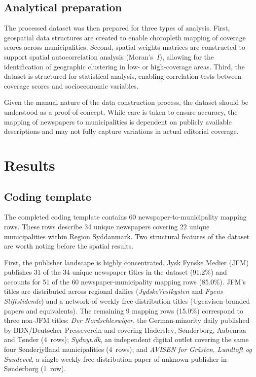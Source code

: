 \documentclass[12pt, a4paper]{article}
\begin{document}
\subsection{Analytical preparation}
The processed dataset was then prepared for three types of analysis. First, geospatial data structures are created to enable choropleth mapping of coverage scores across municipalities. Second, spatial weights matrices are constructed to support spatial autocorrelation analysis (Moran's~$I$), allowing for the identification of geographic clustering in low- or high-coverage areas. Third, the dataset is structured for statistical analysis, enabling correlation tests between coverage scores and socioeconomic variables.

Given the manual nature of the data construction process, the dataset should be understood as a proof-of-concept. While care is taken to ensure accuracy, the mapping of newspapers to municipalities is dependent on publicly available descriptions and may not fully capture variations in actual editorial coverage.

\section{Results}
\subsection{Coding template}
The completed coding template contains 60 newspaper-to-municipality mapping rows. These rows describe 34 unique newspapers covering 22 unique municipalities within Region Syddanmark. Two structural features of the dataset are worth noting before the spatial results.

First, the publisher landscape is highly concentrated. Jysk Fynske Medier (JFM) publishes 31 of the 34 unique newspaper titles in the dataset (91.2\%) and accounts for 51 of the 60 newspaper-municipality mapping rows (85.0\%). JFM's titles are distributed across regional dailies (\emph{JydskeVestkysten} and \emph{Fyens Stiftstidende}) and a network of weekly free-distribution titles (Ugeavisen-branded papers and equivalents). The remaining 9 mapping rows (15.0\%) correspond to three non-JFM titles: \emph{Der Nordschleswiger}, the German-minority daily published by BDN/Deutscher Presseverein and covering Haderslev, Sønderborg, Aabenraa and Tønder (4~rows); \emph{Sydnyt.dk}, an independent digital outlet covering the same four Sønderjylland municipalities (4~rows); and \emph{AVISEN for Gråsten, Lundtoft og Sundeved}, a single weekly free-distribution paper of unknown publisher in Sønderborg (1~row).
\end{document}
